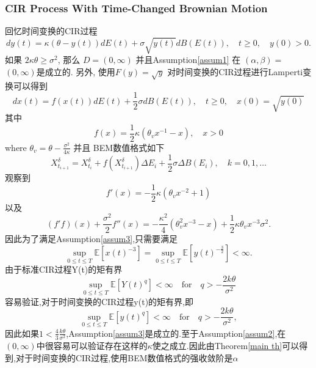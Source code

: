 \documentclass[12pt,final]{article}
\numberwithin{equation}{section}
\numberwithin{figure}{section}
\numberwithin{table}{section}
\theoremstyle{plain}
\theoremstyle{definition}
\theoremstyle{remark}
\begin{document}
\subsubsection{CIR Process With Time-Changed Brownian Motion}
回忆时间变换的CIR过程
$$dy(t)=\kappa(\theta-y(t))dE(t)+\sigma\sqrt{y(t)}dB(E(t)),\quad t\geq0,\quad y(0)>0.$$
如果 $2\kappa\theta\geq\sigma^{2}$, 那么 $D=(0,\infty)$ 并且Assumption\ref{assum1} 在 $(\alpha,\beta)=$
$(0,\infty)$是成立的. 
另外, 使用$F(y)=\sqrt{y}$ 对时间变换的CIR过程进行Lamperti变换可以得到
\begin{equation}
	dx(t)=f(x(t))dE(t)+\frac12\sigma dB(E(t)),\quad t\geq0,\quad x(0)=\sqrt{y(0)}
\end{equation}
其中
\begin{equation}
	f(x)=\dfrac{1}{2}\kappa\left(\theta_vx^{-1}-x\right),\quad x>0
\end{equation}
where $\theta_v=\theta-\frac{\sigma^2}{4\kappa}$ 并且 BEM数值格式如下
\begin{equation}
	X^\delta_{t_{i+1}}=X^\delta_{t_{i}}+f(X^\delta_{t_{i+1}})\Delta E_i+\frac{1}{2}\sigma\Delta B(E_i),\quad k=0,1,\dots 
\end{equation}
观察到
\begin{equation}
	f'(x)=-\frac{1}{2}\kappa(\theta_vx^{-2}+1)
\end{equation}
以及
\begin{equation}
	(f'f)(x)+\frac{\sigma^2}{2}f''(x)=-\frac{\kappa^2}{4}(\theta_v^2x^{-3}-x)+\frac{1}{2}\kappa\theta_vx^{-3}\sigma^2.
\end{equation}
因此为了满足Assumption\ref{assum3},只需要满足
\begin{equation}
	\sup_{0\leq t\leq T}\mathbb{E}[x(t)^{-3}]=\sup_{0\leq t\leq T}\mathbb{E}[y(t)^{-\frac{3}{2}}] < \infty.
\end{equation}
由于标准CIR过程Y(t)的矩有界
\begin{equation}
	\sup\limits_{0\leq t\leq T}\mathbb{E}[Y(t)^q]<\infty\quad\mathrm{for}\quad q>-\frac{2k\theta}{\sigma^2}
\end{equation}
容易验证,对于时间变换的CIR过程y(t)的矩有界,即
\begin{equation}
	\sup\limits_{0\leq t\leq T}\mathbb{E}[y(t)^q]<\infty\quad\mathrm{for}\quad q>-\frac{2k\theta}{\sigma^2},
\end{equation}
因此如果$1 < \frac{4}{3}\frac{k\theta}{\sigma^2}$,Assumption\ref{assum3}是成立的.至于Assumption\ref{assum2},在$(0,\infty)$中很容易可以验证存在这样的$\kappa$使之成立.因此由Theorem\ref{main th}可以得到,对于时间变换的CIR过程,使用BEM数值格式的强收敛阶是$\alpha$
\end{document}
